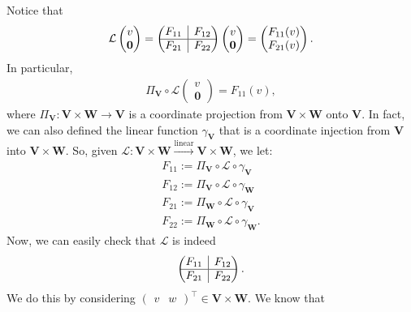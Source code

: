 \documentclass{article}
\theoremstyle{definition}
\newcommand{\V}{\mathbf{V}}
\newcommand{\W}{\mathbf{W}}
\newcommand{\lag}{\mathcal{L}}
\newcommand{\lin}{\overset{\text{linear}}{\longrightarrow}}
\newcommand{\rvline}{\hspace*{-\arraycolsep}\vline\hspace*{-\arraycolsep}}
\begin{document}
Notice that 
\begin{align}
\lag\begin{pmatrix}
v\\\mathbf{0}
\end{pmatrix}
=
\begin{pmatrix}
\begin{matrix}
F_{11}
\end{matrix}
& \rvline & F_{12} \\
\hline
F_{21} & \rvline &
F_{22}
\end{pmatrix}\begin{pmatrix}
v\\\mathbf{0}
\end{pmatrix} = \begin{pmatrix}
F_{11}(v) \\ F_{21}(v)
\end{pmatrix}.
\end{align}
In particular, 
\begin{align}
\Pi_\V \circ \lag \begin{pmatrix}
v \\ \mathbf{0}
\end{pmatrix} = F_{11}(v),
\end{align}
where $\Pi_\V : \V\times \W \to \V$ is a coordinate projection from $\V\times \W$ onto $\V$. In fact, we can also defined the linear function $\gamma_\V$ that is a coordinate injection from $\V$ into $\V\times\W$. So, given $\lag : \V\times \W \lin \V\times \W$, we let:
\begin{align}
F_{11} := \Pi_\V \circ \lag \circ \gamma_\V\\
F_{12} := \Pi_\V \circ \lag \circ \gamma_\W\\
F_{21} := \Pi_\W \circ \lag \circ \gamma_\V\\
F_{22} := \Pi_\W \circ \lag \circ \gamma_\W.
\end{align}
Now, we can easily check that $\lag$ is indeed
\begin{align}
\begin{pmatrix}
\begin{matrix}
F_{11}
\end{matrix}
& \rvline & F_{12} \\
\hline
F_{21} & \rvline &
F_{22}
\end{pmatrix}.
\end{align}
We do this by considering $\begin{pmatrix}
v & w
\end{pmatrix}^\top \in \V \times \W$. We know that
\end{document}
